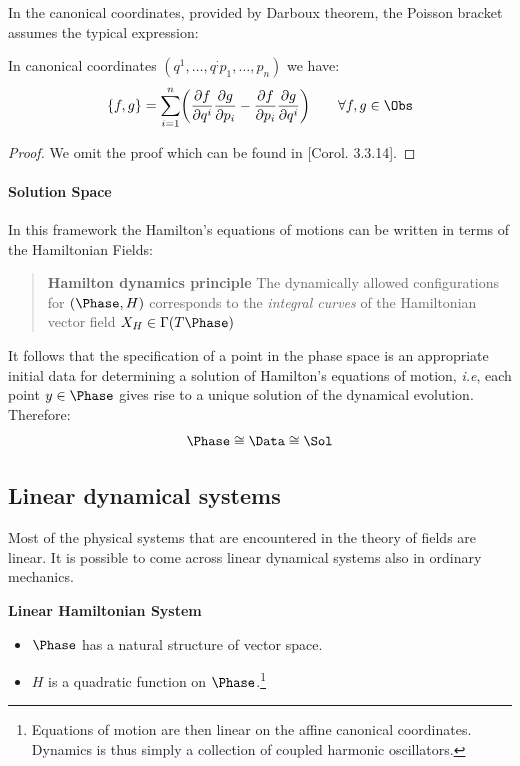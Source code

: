 \documentclass[Main]{subfiles}
\begin{document}
	
	\vspace{2mm}
	In the canonical coordinates, provided  by  Darboux theorem, the  Poisson bracket assumes the typical expression:
	\begin{proposition}
	
	In canonical coordinates  $(q^1, \ldots, q^; p_1, \ldots, p_n)$ we have:
	\begin{equation}\label{Eq:SymplecticCoordinateRepresentation}
		\{f,g\} = \sum_{i=1}^n \biggr(\frac{\partial f}{\partial q^i} \frac{\partial g}{\partial p_i}  - \frac{\partial f}{\partial p_i} \frac{\partial g}{\partial q^i} \biggr) \qquad \forall f,g \in \Obs
	\end{equation}
	\end{proposition}
	\begin{proof}
			We omit the proof which can be found in \cite{Abraham1978}[Corol. 3.3.14].
	\end{proof}

	\paragraph{Solution Space}
	In this framework the Hamilton's equations of motions can be written in terms of the Hamiltonian Fields:
				\begin{quotation}
				\textbf{Hamilton dynamics principle}
				The dynamically allowed configurations for $(\Phase,H)$ corresponds to the \emph{ integral curves}\cite{Abraham1978} of the Hamiltonian vector field $X_H \in \Gamma(T\Phase)$
			\end{quotation}
		It follows that the specification of a point in the phase space is an appropriate initial data for determining a solution of Hamilton's equations of motion, \textit{i.e}, each point $y\in \Phase$  gives rise to a unique solution of the dynamical evolution.
		Therefore:
		\begin{equation}\label{Eq:PhaseDataSol}
			\Phase \cong \Data \cong \Sol
		\end{equation}
	
	\subsection{Linear dynamical systems}\label{Section:LinearClassicalSystem}
	Most of the physical systems that are encountered in the theory of fields are linear.	
	It is possible to come across linear dynamical systems also in ordinary mechanics. 
		\begin{remark}
			\textbf{Linear Hamiltonian System}
			\begin{itemize}
				\item $\Phase$ has a natural structure of vector space.
				\item	$H$ is a quadratic function on $\Phase$.\footnote{Equations of motion are then linear on the affine canonical coordinates. Dynamics is thus simply a collection of coupled harmonic oscillators.}
			\end{itemize}
		\end{remark}
\end{document}
